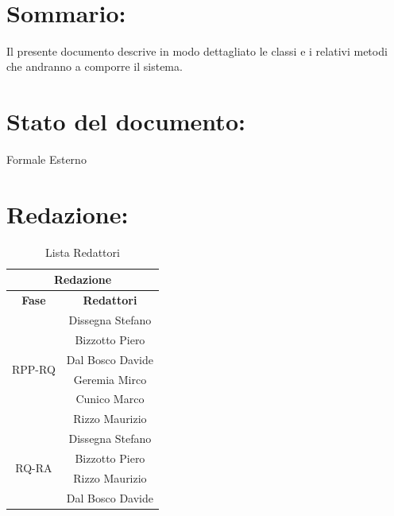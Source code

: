 \newpage

\begin{center} %
	\begin{Huge}	
				\textbf{\TITOLODOC}
			\\
	\end{Huge}
\end{center}

\section*{\LARGE Sommario:} %
Il presente documento descrive in modo dettagliato le classi e i relativi metodi che andranno a comporre il sistema.

\indent \indent

\section*{\LARGE Stato del documento:}
\indent \indent
	Formale Esterno

\section*{\LARGE Redazione:}
	\begin{table}[!h]
		\begin{center}
			\begin{tabular}
				{|c|c|}
				\hline
				\multicolumn{2}{|c|}{ \textbf{Redazione} } \\
				\hline
				\textbf{Fase} & \textbf{Redattori} \\
				\hline
				\multirow{6}{*}{RPP-RQ} 
				& Dissegna Stefano \\
				& Bizzotto Piero \\
				& Dal Bosco Davide \\
				& Geremia Mirco \\
				& Cunico Marco \\
				& Rizzo Maurizio \\
				
				\hline
				\multirow{4}{*}{RQ-RA} & Dissegna Stefano \\
                                & Bizzotto Piero \\
                                & Rizzo Maurizio \\
                                & Dal Bosco Davide \\
												
				\hline
			\end{tabular}
			\caption{Lista Redattori} %
			\label{tabredazione}
		\end{center}
	\end{table}
	
